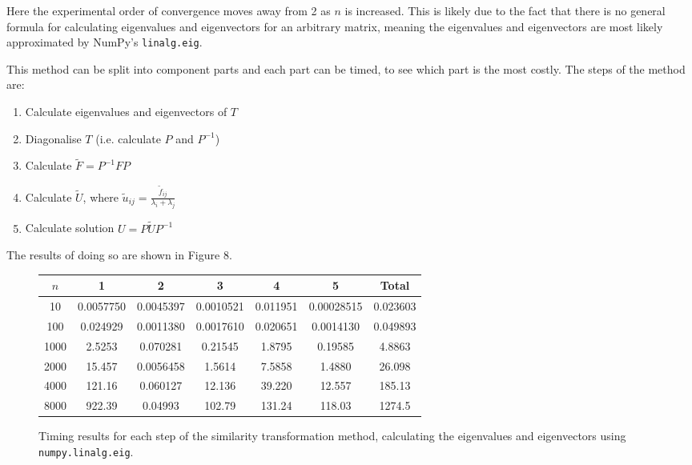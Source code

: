 \documentclass{article}
\numberwithin{equation}{section}
\begin{document}
Here the experimental order of convergence moves away from 2 as $n$ is increased. This is likely due to the fact that there is no general formula for calculating eigenvalues and eigenvectors for an arbitrary matrix, meaning the eigenvalues and eigenvectors are most likely approximated by NumPy's \texttt{linalg.eig}.

This method can be split into component parts and each part can be timed, to see which part is the most costly. The steps of the method are:
\begin{enumerate}
\item Calculate eigenvalues and eigenvectors of $T$
\item Diagonalise $T$ (i.e. calculate $P$ and $P^{-1}$)
\item Calculate $\tilde{F}=P^{-1}FP$
\item Calculate $\tilde{U}$, where $\tilde{u}_{ij} = \frac{\tilde{f}_{ij}}{\lambda_i + \lambda_j}$
\item Calculate solution $U=P \tilde{U}P^{-1}$
\end{enumerate}

The results of doing so are shown in Figure 8.

\begin{figure}[H]
\centering
\begin{tabular}{|c|c|c|c|c|c|c|}
\hline
$n$ & 1 & 2 & 3 & 4 & 5 & Total \\
\hline
10 & 0.0057750 & 0.0045397 & 0.0010521 & 0.011951 & 0.00028515 & 0.023603 \\
100 & 0.024929 & 0.0011380 & 0.0017610 & 0.020651 & 0.0014130 & 0.049893 \\
1000 & 2.5253 & 0.070281 & 0.21545 & 1.8795 & 0.19585 & 4.8863 \\
2000 & 15.457 & 0.0056458 & 1.5614 & 7.5858 & 1.4880 & 26.098 \\
4000 & 121.16 & 0.060127 & 12.136 & 39.220 & 12.557 & 185.13 \\
8000 & 922.39 & 0.04993 & 102.79 & 131.24 & 118.03 & 1274.5  \\
\hline
\end{tabular}
\captionsetup{justification=centering}
\caption{Timing results for each step of the similarity transformation method, calculating the eigenvalues and eigenvectors using \texttt{numpy.linalg.eig}.}
\end{figure}
\end{document}
